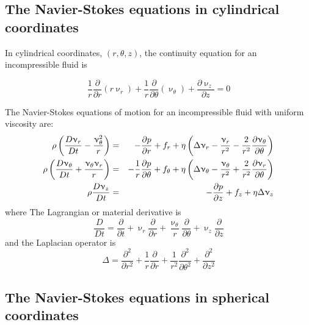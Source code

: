 \subsection{The Navier-Stokes equations in cylindrical coordinates}

In cylindrical coordinates, $(r,\theta,z)$, the continuity equation for an incompressible fluid is 
\begin{mdframed}[backgroundcolor=blue!5]
\begin{equation}
\frac{1}{r} \frac{\partial}{\partial r} (r \upnu_r) + 
\frac{1}{r} \frac{\partial}{\partial \theta} (\upnu_\theta) + 
\frac{\partial \upnu_z}{\partial z} =0
\end{equation}
\end{mdframed}

The Navier-Stokes equations of motion for an incompressible fluid with uniform viscosity are:
\begin{eqnarray}
\rho \left(  \frac{D\upnu_r}{Dt} -\frac{\upnu_\theta^2}{r} \right) 
&=& -\frac{\partial p}{\partial r} + f_r + \eta
\left( \Delta \upnu_r - \frac{\upnu_r}{r^2} - \frac{2}{r^2} \frac{\partial \upnu_\theta}{\partial \theta}
\right)
\nonumber\\
\rho \left(  \frac{D\upnu_\theta}{Dt} +\frac{\upnu_\theta \upnu_r}{r} \right) 
&=&
-\frac{1}{r} \frac{\partial p}{\partial \theta} + f_\theta + \eta
\left(
\Delta \upnu_\theta - \frac{\upnu_\theta}{r^2} + \frac{2}{r^2} \frac{\partial \upnu_r}{\partial\theta}
\right)
\nonumber\\
\rho \frac{D\upnu_z}{Dt} 
&=& 
-\frac{\partial p}{\partial z} + f_z + \eta \Delta \upnu_z
\end{eqnarray}
where The Lagrangian or material derivative is
\[
\frac{D}{Dt} = \frac{\partial}{\partial t} 
+ \upnu_r \frac{\partial}{\partial r}  
+ \frac{\upnu_\theta}{r} \frac{\partial}{\partial \theta}
+ \upnu_z \frac{\partial}{\partial z}  
\]
and the Laplacian operator is   
\begin{equation}
\Delta 
= \frac{\partial^2 }{\partial r^2}  +\frac{1}{r} \frac{\partial }{\partial r}
+ \frac{1}{r^2}  \frac{\partial^2}{\partial \theta^2}
+ \frac{\partial^2 }{\partial z^2}
\end{equation}


\subsection{The Navier-Stokes equations in spherical coordinates}


